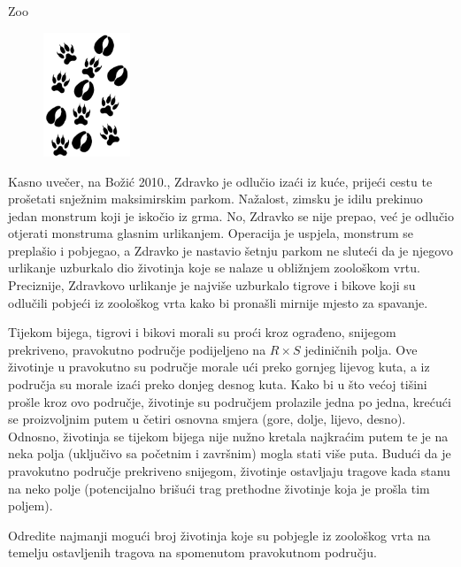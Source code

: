 \begin{statement}[
  problempoints=110,
  timelimit=1 sekunda,
  memorylimit=512 MiB,
]{Zoo}

\setlength\intextsep{-0.1cm}
\begin{figure}
\centering
\includegraphics[width=0.23\textwidth]{img/tragovi.png}
\end{figure}

Kasno uvečer, na Božić 2010., Zdravko je odlučio izaći iz kuće, prijeći cestu te
prošetati snježnim maksimirskim parkom. Nažalost, zimsku je idilu prekinuo jedan
monstrum koji je iskočio iz grma. No, Zdravko se nije prepao, već je odlučio
otjerati monstruma glasnim urlikanjem. Operacija je uspjela, monstrum se
preplašio i pobjegao, a Zdravko je nastavio šetnju parkom ne sluteći da je
njegovo urlikanje uzburkalo dio životinja koje se nalaze u obližnjem zoološkom
vrtu. Preciznije, Zdravkovo urlikanje je najviše uzburkalo tigrove i bikove koji
su odlučili pobjeći iz zoološkog vrta kako bi pronašli mirnije mjesto za
spavanje.

Tijekom bijega, tigrovi i bikovi morali su proći kroz ograđeno, snijegom
prekriveno, pravokutno područje podijeljeno na $R \times S$ jediničnih polja.
Ove životinje u pravokutno su područje morale ući preko gornjeg lijevog kuta, a
iz područja su morale izaći preko donjeg desnog kuta. Kako bi u što većoj tišini
prošle kroz ovo područje, životinje su područjem prolazile jedna po jedna,
krećući se proizvoljnim putem u četiri osnovna smjera (gore, dolje, lijevo,
desno). Odnosno, životinja se tijekom bijega nije nužno kretala najkraćim putem
te je na neka polja (uključivo sa početnim i završnim) mogla stati više puta.
Budući da je pravokutno područje prekriveno snijegom, životinje ostavljaju
tragove kada stanu na neko polje (potencijalno brišući trag prethodne životinje
koja je prošla tim poljem).

Odredite najmanji mogući broj životinja koje su pobjegle iz zoološkog vrta na
temelju ostavljenih tragova na spomenutom pravokutnom području.


\end{statement}
